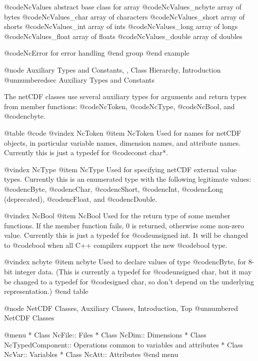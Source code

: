 @code{NcValues}                   abstract base class for array
        @code{NcValues_ncbyte}      array of bytes
        @code{NcValues_char}        array of characters
        @code{NcValues_short}       array of shorts
        @code{NcValues_int}         array of ints
        @code{NcValues_long}        array of longs
        @code{NcValues_float}       array of floats
        @code{NcValues_double}      array of doubles

@code{NcError}                    for error handling
@end group
@end example

@node Auxiliary Types and Constants,  , Class Hierarchy, Introduction
@unnumberedsec Auxiliary Types and Constants

The netCDF classes use several auxiliary types for arguments and return
types from member functions: @code{NcToken}, @code{NcType},
@code{NcBool}, and @code{ncbyte}.

@table @code
@vindex NcToken
@item NcToken
Used for names for netCDF objects, in particular variable names, dimension
names, and attribute names.  Currently this is just a typedef for
@code{const char*}.

@vindex NcType
@item NcType
Used for specifying netCDF external value types.  Currently this is an
enumerated type with the following legitimate values: @code{ncByte},
@code{ncChar}, @code{ncShort}, @code{ncInt}, @code{ncLong} (deprecated),
@code{ncFloat}, and @code{ncDouble}.

@vindex NcBool
@item NcBool
Used for the return type of some member functions.  If the member
function fails, 0 is returned, otherwise some non-zero value.  Currently
this is just a typedef for @code{unsigned int}.  It will be changed to
@code{bool} when all C++ compilers support the new @code{bool} type.

@vindex ncbyte
@item ncbyte
Used to declare values of type @code{ncByte}, for 8-bit integer data.
(This is currently a typedef for @code{unsigned char}, but it may be
changed to a typedef for @code{signed char}, so don't depend on the
underlying representation.)
@end table

@node NetCDF Classes, Auxiliary Classes, Introduction, Top
@unnumbered     NetCDF Classes

@menu
* Class NcFile::                Files
* Class NcDim::                 Dimensions
* Class NcTypedComponent::      Operations common to variables and attributes
* Class NcVar::                 Variables
* Class NcAtt::                 Attributes
@end menu

